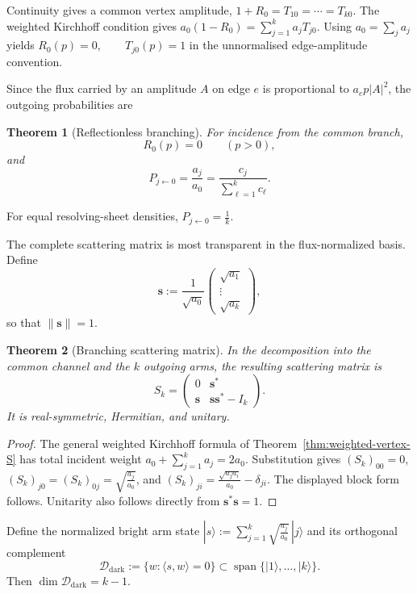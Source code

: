 \documentclass[11pt]{article}
\theoremstyle{plain}
\newtheorem{theorem}{Theorem}[section]
\theoremstyle{definition}
\begin{document}
Continuity gives a common vertex amplitude,
\(1+R_0 = T_{10} = \cdots = T_{k0}\).
The weighted Kirchhoff condition gives
\(a_0(1-R_0) = \sum_{j=1}^{k}a_jT_{j0}\).
Using \(a_0=\sum_j a_j\) yields \(R_0(p)=0, \qquad T_{j0}(p)=1\) in the unnormalised edge-amplitude convention.

Since the flux carried by an amplitude \(A\) on edge \(e\) is proportional
to
\(a_ep|A|^2\),
the outgoing probabilities are

\begin{theorem}[Reflectionless branching]
\label{thm:Bk-reflectionless}
For incidence from the common branch,
\[
  R_0(p)=0
  \qquad
  (p>0),
\]
and
\[
  P_{j\leftarrow0}
  =
  \frac{a_j}{a_0}
  =
  \frac{c_j}{\sum_{\ell=1}^{k}c_\ell}.
\]
\end{theorem}

For equal resolving-sheet densities,
\(P_{j\leftarrow0}=\frac1k\).

The complete scattering matrix is most transparent in the flux-normalized
basis. Define
\[
  \mathbf s
  :=
  \frac{1}{\sqrt{a_0}}
  \begin{pmatrix}
    \sqrt{a_1}\\
    \vdots\\
    \sqrt{a_k}
  \end{pmatrix},
\]
so that
\(\|\mathbf s\|=1\).

\begin{theorem}[Branching scattering matrix]
\label{thm:Bk-S}
In the decomposition into the common channel and the \(k\) outgoing arms,
the resulting scattering matrix is
\[
  S_k
  =
  \begin{pmatrix}
    0 & \mathbf s^*\\
    \mathbf s & \mathbf s\mathbf s^*-I_k
  \end{pmatrix}.
\]
It is real-symmetric, Hermitian, and unitary.
\end{theorem}

\begin{proof}
The general weighted Kirchhoff formula of
Theorem~\ref{thm:weighted-vertex-S} has total incident weight
\(a_0+\sum_{j=1}^{k}a_j=2a_0\).
Substitution gives
\((S_k)_{00}=0\),
\((S_k)_{j0} = (S_k)_{0j} = \sqrt{\frac{a_j}{a_0}}\),
and
\((S_k)_{ji} = \frac{\sqrt{a_ja_i}}{a_0} - \delta_{ji}\).
The displayed block form follows. Unitarity also follows directly from
\(\mathbf s^*\mathbf s=1\).
\end{proof}

Define the normalized bright arm state \(|s\rangle := \sum_{j=1}^{k} \sqrt{\frac{a_j}{a_0}}\, |j\rangle\) and its orthogonal complement
\[
  \mathcal D_{\mathrm{dark}}
  :=
  \{
    w:
    \langle s,w\rangle=0
  \}
  \subset
  \operatorname{span}\{|1\rangle,\ldots,|k\rangle\}.
\]
Then
\(\dim\mathcal D_{\mathrm{dark}}=k-1\).
\end{document}
